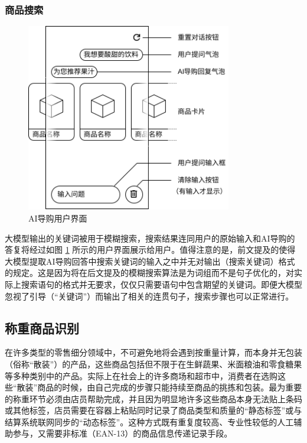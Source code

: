 \subsubsection{商品搜索}

\begin{figure}[htbp]
	\centering
	\includegraphics[width=0.8\textwidth, height=0.3\textheight, keepaspectratio]{./imgs/se-assist.png}
	\caption{AI导购用户界面}
	\label{fig:se-assist}
\end{figure}

大模型输出的关键词被用于模糊搜索，搜索结果连同用户的原始输入和AI导购的答复将经过如图 \ref{fig:se-assist} 所示的用户界面展示给用户。值得注意的是，前文提及的使得大模型提取AI导购回答中搜索关键词的输入之中并无对输出（搜索关键词）格式的规定。这是因为将在后文提及的模糊搜索算法是为词组而不是句子优化的，对实际上搜索语句的格式并无要求，仅仅只需要语句中包含期望的关键词。即便大模型忽视了引导（“关键词”）而输出了相关的连贯句子，搜索步骤也可以正常进行。

\subsection{称重商品识别}

在许多类型的零售细分领域中，不可避免地将会遇到按重量计算，而本身并无包装（俗称“散装”）的产品，这些商品包括但不限于在生鲜蔬果、米面粮油和零食糖果等多种类别中的产品。实际上在社会上的许多商场和超市中，消费者在选购这些“散装”商品的时候，由自己完成的步骤只能持续至商品的挑拣和包装。最为重要的称重环节必须由店员帮助完成，并且因为明显地许多这些商品本身无法贴上条码或其他标签，店员需要在容器上粘贴同时记录了商品类型和质量的“静态标签”或与结算系统联网同步的“动态标签”。这种方式既有重复度较高、专业性较低的人工辅助参与，又需要非标准（EAN-13）的商品信息传递记录手段。

